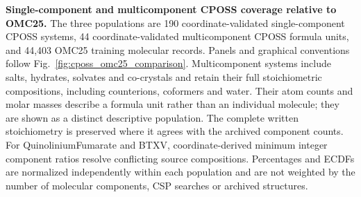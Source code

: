 \caption{\textbf{Single-component and multicomponent CPOSS coverage relative to OMC25.} The three populations are 190 coordinate-validated single-component CPOSS systems, 44 coordinate-validated multicomponent CPOSS formula units, and 44,403 OMC25 training molecular records. Panels and graphical conventions follow Fig.~\ref{fig:cposs_omc25_comparison}. Multicomponent systems include salts, hydrates, solvates and co-crystals and retain their full stoichiometric compositions, including counterions, coformers and water. Their atom counts and molar masses describe a formula unit rather than an individual molecule; they are shown as a distinct descriptive population. The complete written stoichiometry is preserved where it agrees with the archived component counts. For QuinoliniumFumarate and BTXV, coordinate-derived minimum integer component ratios resolve conflicting source compositions. Percentages and ECDFs are normalized independently within each population and are not weighted by the number of molecular components, CSP searches or archived structures.}
\label{fig:cposs_omc25_multicomponent}

